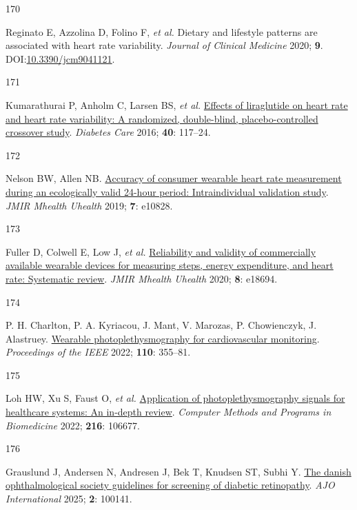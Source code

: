 \documentclass[
  a4paper,
  headsepline=true,
  open=left]{scrbook}
\newlength{\cslhangindent}
\newlength{\csllabelwidth}
\newlength{\cslentryspacingunit} %
\newenvironment{CSLReferences}[2] %
 {%
  \setlength{\parindent}{0pt}
  \ifodd #1
  \let\oldpar\par
  \def\par{\hangindent=\cslhangindent\oldpar}
  \fi
  \setlength{\parskip}{#2\cslentryspacingunit}
 }%
 {}
\newcommand{\CSLLeftMargin}[1]{\parbox[t]{\csllabelwidth}{#1}}
\newcommand{\CSLRightInline}[1]{\parbox[t]{\linewidth - \csllabelwidth}{#1}\break}
\begin{document}
\begin{CSLReferences}{0}{0}
\leavevmode{}%
\CSLLeftMargin{170 }%
\CSLRightInline{Reginato E, Azzolina D, Folino F, \emph{et al.} Dietary
and lifestyle patterns are associated with heart rate variability.
\emph{Journal of Clinical Medicine} 2020; \textbf{9}.
DOI:\href{https://doi.org/10.3390/jcm9041121}{10.3390/jcm9041121}.}

\leavevmode{}%
\CSLLeftMargin{171 }%
\CSLRightInline{Kumarathurai P, Anholm C, Larsen BS, \emph{et al.}
\href{https://doi.org/10.2337/dc16-1580}{Effects of liraglutide on heart
rate and heart rate variability: A randomized, double-blind,
placebo-controlled crossover study}. \emph{Diabetes Care} 2016;
\textbf{40}: 117--24.}

\leavevmode{}%
\CSLLeftMargin{172 }%
\CSLRightInline{Nelson BW, Allen NB.
\href{https://doi.org/10.2196/10828}{Accuracy of consumer wearable heart
rate measurement during an ecologically valid 24-hour period:
Intraindividual validation study}. \emph{JMIR Mhealth Uhealth} 2019;
\textbf{7}: e10828.}

\leavevmode{}%
\CSLLeftMargin{173 }%
\CSLRightInline{Fuller D, Colwell E, Low J, \emph{et al.}
\href{https://doi.org/10.2196/18694}{Reliability and validity of
commercially available wearable devices for measuring steps, energy
expenditure, and heart rate: Systematic review}. \emph{JMIR Mhealth
Uhealth} 2020; \textbf{8}: e18694.}

\leavevmode{}%
\CSLLeftMargin{174 }%
\CSLRightInline{P. H. Charlton, P. A. Kyriacou, J. Mant, V. Marozas, P.
Chowienczyk, J. Alastruey.
\href{https://doi.org/10.1109/JPROC.2022.3149785}{Wearable
photoplethysmography for cardiovascular monitoring}. \emph{Proceedings
of the IEEE} 2022; \textbf{110}: 355--81.}

\leavevmode{}%
\CSLLeftMargin{175 }%
\CSLRightInline{Loh HW, Xu S, Faust O, \emph{et al.}
\href{https://doi.org/10.1016/j.cmpb.2022.106677}{Application of
photoplethysmography signals for healthcare systems: An in-depth
review}. \emph{Computer Methods and Programs in Biomedicine} 2022;
\textbf{216}: 106677.}

\leavevmode{}%
\CSLLeftMargin{176 }%
\CSLRightInline{Grauslund J, Andersen N, Andresen J, Bek T, Knudsen ST,
Subhi Y. \href{https://doi.org/10.1016/j.ajoint.2025.100141}{The danish
ophthalmological society guidelines for screening of diabetic
retinopathy}. \emph{AJO International} 2025; \textbf{2}: 100141.}


\end{CSLReferences}
\end{document}
